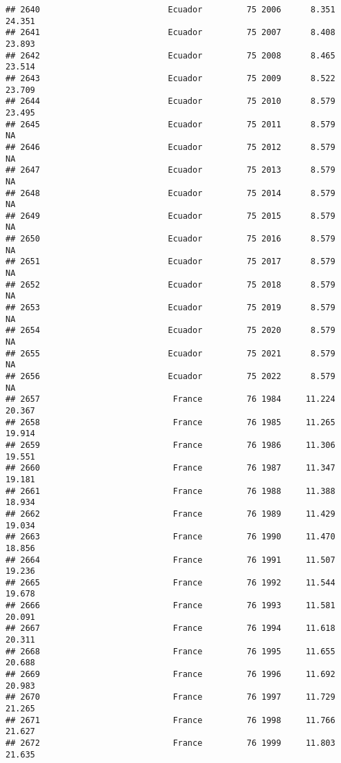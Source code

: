 \documentclass[
]{article}
\begin{document}
\begin{verbatim}
## 2640                          Ecuador         75 2006      8.351     24.351
## 2641                          Ecuador         75 2007      8.408     23.893
## 2642                          Ecuador         75 2008      8.465     23.514
## 2643                          Ecuador         75 2009      8.522     23.709
## 2644                          Ecuador         75 2010      8.579     23.495
## 2645                          Ecuador         75 2011      8.579         NA
## 2646                          Ecuador         75 2012      8.579         NA
## 2647                          Ecuador         75 2013      8.579         NA
## 2648                          Ecuador         75 2014      8.579         NA
## 2649                          Ecuador         75 2015      8.579         NA
## 2650                          Ecuador         75 2016      8.579         NA
## 2651                          Ecuador         75 2017      8.579         NA
## 2652                          Ecuador         75 2018      8.579         NA
## 2653                          Ecuador         75 2019      8.579         NA
## 2654                          Ecuador         75 2020      8.579         NA
## 2655                          Ecuador         75 2021      8.579         NA
## 2656                          Ecuador         75 2022      8.579         NA
## 2657                           France         76 1984     11.224     20.367
## 2658                           France         76 1985     11.265     19.914
## 2659                           France         76 1986     11.306     19.551
## 2660                           France         76 1987     11.347     19.181
## 2661                           France         76 1988     11.388     18.934
## 2662                           France         76 1989     11.429     19.034
## 2663                           France         76 1990     11.470     18.856
## 2664                           France         76 1991     11.507     19.236
## 2665                           France         76 1992     11.544     19.678
## 2666                           France         76 1993     11.581     20.091
## 2667                           France         76 1994     11.618     20.311
## 2668                           France         76 1995     11.655     20.688
## 2669                           France         76 1996     11.692     20.983
## 2670                           France         76 1997     11.729     21.265
## 2671                           France         76 1998     11.766     21.627
## 2672                           France         76 1999     11.803     21.635

\end{verbatim}
\end{document}
